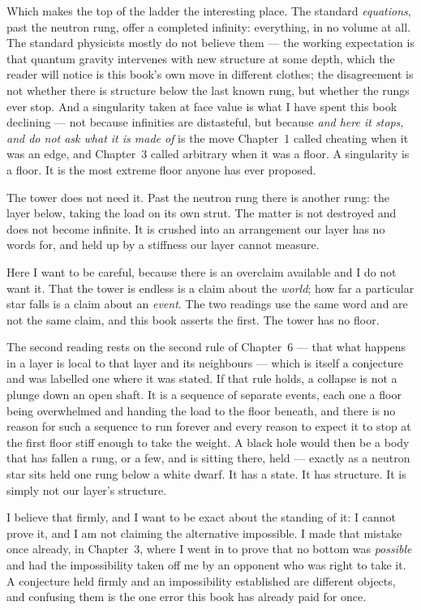 \documentclass[fontsize=11pt,paper=a4,pagesize=auto,parskip=half-]{scrbook}
\begin{document}
Which makes the top of the ladder the interesting place. The standard \emph{equations}, past the neutron rung, offer a completed infinity: everything, in no volume at all. The standard physicists mostly do not believe them --- the working expectation is that quantum gravity intervenes with new structure at some depth, which the reader will notice is this book's own move in different clothes; the disagreement is not whether there is structure below the last known rung, but whether the rungs ever stop. And a singularity taken at face value is what I have spent this book declining --- not because infinities are distasteful, but because \emph{and here it stops, and do not ask what it is made of} is the move Chapter~1 called cheating when it was an edge, and Chapter~3 called arbitrary when it was a floor. A singularity is a floor. It is the most extreme floor anyone has ever proposed.

The tower does not need it. Past the neutron rung there is another rung: the layer below, taking the load on its own strut. The matter is not destroyed and does not become infinite. It is crushed into an arrangement our layer has no words for, and held up by a stiffness our layer cannot measure.

Here I want to be careful, because there is an overclaim available and I do not want it. That the tower is endless is a claim about the \emph{world}; how far a particular star falls is a claim about an \emph{event}. The two readings use the same word and are not the same claim, and this book asserts the first. The tower has no floor.

The second reading rests on the second rule of Chapter~6 --- that what happens in a layer is local to that layer and its neighbours --- which is itself a conjecture and was labelled one where it was stated. If that rule holds, a collapse is not a plunge down an open shaft. It is a sequence of separate events, each one a floor being overwhelmed and handing the load to the floor beneath, and there is no reason for such a sequence to run forever and every reason to expect it to stop at the first floor stiff enough to take the weight. A black hole would then be a body that has fallen a rung, or a few, and is sitting there, held --- exactly as a neutron star sits held one rung below a white dwarf. It has a state. It has structure. It is simply not our layer's structure.

I believe that firmly, and I want to be exact about the standing of it: I cannot prove it, and I am not claiming the alternative impossible. I made that mistake once already, in Chapter~3, where I went in to prove that no bottom was \emph{possible} and had the impossibility taken off me by an opponent who was right to take it. A conjecture held firmly and an impossibility established are different objects, and confusing them is the one error this book has already paid for once.
\end{document}
